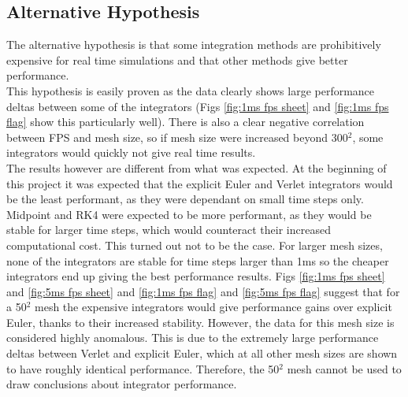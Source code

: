 \subsection{Alternative Hypothesis}
The alternative hypothesis is that some integration methods are prohibitively expensive for real time simulations and that other methods give better performance.
\\This hypothesis is easily proven as the data clearly shows large performance deltas between some of the integrators (Figs \ref{fig:1ms fps sheet} and \ref{fig:1ms fps flag} show this particularly well). There is also a clear negative correlation between FPS and mesh size, so if mesh size were increased beyond 300$^{2}$, some integrators would quickly not give real time results.
\\The results however are different from what was expected. At the beginning of this project it was expected that the explicit Euler and Verlet integrators would be the least performant, as they were dependant on small time steps only. Midpoint and RK4 were expected to be more performant, as they would be stable for larger time steps, which would counteract their increased computational cost. This turned out not to be the case. For larger mesh sizes, none of the integrators are stable for time steps larger than 1ms so the cheaper integrators end up giving the best performance results. Figs \ref{fig:1ms fps sheet} and \ref{fig:5ms fps sheet} and \ref{fig:1ms fps flag} and \ref{fig:5ms fps flag} suggest that for a 50$^{2}$ mesh the expensive integrators would give performance gains over explicit Euler, thanks to their increased stability. However, the data for this mesh size is considered highly anomalous. This is due to the extremely large performance deltas between Verlet and explicit Euler, which at all other mesh sizes are shown to have roughly identical performance. Therefore, the 50$^{2}$ mesh cannot be used to draw conclusions about integrator performance.